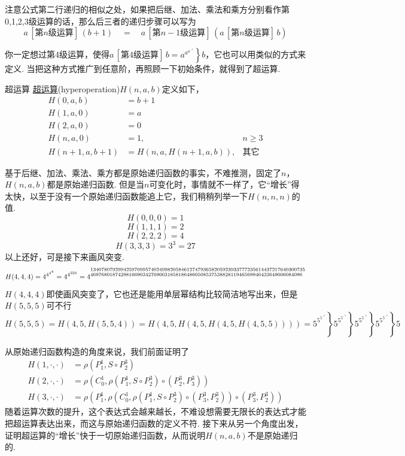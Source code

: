 注意公式第二行递归的相似之处，如果把后继、加法、乘法和乘方分别看作第0,1,2,3级运算的话，那么后三者的递归步骤可以写为
\[a \, [\mbox{第}n\mbox{级运算}] \, (b+1) \quad = \quad a \, [\mbox{第}n-1\mbox{级运算}] \, (a \, [\mbox{第}n\mbox{级运算}] \, b)\]

你一定想过第4级运算，使得\(a \, [\mbox{第}4\mbox{级运算}]\, b = \left. a^{a^{a^{\iddots^a}}} \right\}b\)，它也可以用类似的方式来定义. 当把这种方式推广到任意阶，再照顾一下初始条件，就得到了超运算.

\begin{definition}{超运算}
    \underline{超运算}(hyperoperation)\(H(n,a,b)\)定义如下，
    \begin{align*}
        H(0,a,b) &= b+1 & \\
        H(1,a,0) &= a & \\
        H(2,a,0) &= 0 & \\
        H(n,a,0) &= 1, &n \geq 3 \\
        H(n+1,a,b+1) &= H(n,a,H(n+1,a,b)), &\mbox{其它}
    \end{align*}
\end{definition}

基于后继、加法、乘法、乘方都是原始递归函数的事实，不难推测，固定了\(n\)，\(H(n,a,b)\)都是原始递归函数. 但是当\(n\)可变化时，事情就不一样了，它“增长”得太快，以至于没有一个原始递归函数能追上它，我们稍稍列举一下\(H(n,n,n)\)的值.
\[H(0,0,0) = 1\]
\[H(1,1,1) = 2\]
\[H(2,2,2) = 4\]
\[H(3,3,3) = 3^3 = 27\]
以上还好，可是接下来画风突变.
\[H(4,4,4) = 4^{4^{4^4}} = 4^{4^{256}} = 4^{\makebox{\shortstack[l]{\scriptsize 134078079299425970995740249982058461274793658205923933777235614437217640300735\\\scriptsize 46976801874298166903427690031858186486050853753882811946569946433649006084096}}}\]
\(H(4,4,4)\)即使画风突变了，它也还是能用单层幂结构比较简洁地写出来，但是\(H(5,5,5)\)可不行
\[H(5,5,5) = H(4,5,H(5,5,4)) = H(4,5,H(4,5,H(4,5,H(4,5,5)))) = \left.\left.\left.\left.5^{5^{5^{\iddots^5}}} \right\}5^{5^{5^{\iddots^5}}} \right\}5^{5^{5^{\iddots^5}}} \right\}5^{5^{5^{\iddots^5}}} \right\}5\]

从原始递归函数构造的角度来说，我们前面证明了
\begin{align*}
    H(1,\cdot,\cdot) &= \rho(P^1_1, S \circ P^3_2) \\
    H(2,\cdot,\cdot) &= \rho(C^1_0, \rho(P^1_1, S \circ P^3_2) \circ (P^3_2,P^3_3)) \\
    H(3,\cdot,\cdot) &= \rho(P^1_1,\rho(C^1_0,\rho(P^1_1,S\circ P^3_2) \circ (P^3_3,P^3_2)) \circ (P^3_3,P^3_2))
\end{align*}
随着运算次数的提升，这个表达式会越来越长，不难设想需要无限长的表达式才能把超运算表达出来，而这与原始递归函数的定义不符. 接下来从另一个角度出发，证明超运算的“增长”快于一切原始递归函数，从而说明\(H(n,a,b)\)不是原始递归的. 

